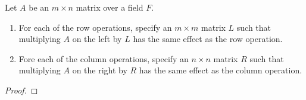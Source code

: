 \prob
{
    Let $A$ be an $m \times n$ matrix over a field $F$.
    \begin{enumerate}[label=(\roman*)]
        \item For each of the row operations, specify an $m \times m$ matrix $L$ such that
              multiplying $A$ on the left by $L$ has the same effect as the row operation.\pn
        \item Fore each of the column operations, specify an $n \times n$ matrix $R$ such that multiplying $A$ on the right
                by $R$ has the same effect as the column operation.
    \end{enumerate}
}
\begin{proof}
\end{proof}